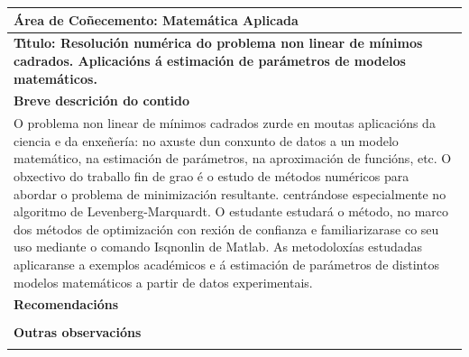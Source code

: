 \documentclass[11pt,a4paper]{book}
\theoremstyle{definition}
\theoremstyle{remark}
\begin{document}
\begingroup
\renewcommand*{\arraystretch}{2.2}
\begin{tabular}{|l|}
	\hline
	
	{\bf \'Area de Co\~necemento:  \/ Matemática Aplicada}\\ \hline
	\begin{minipage}{11.5cm}
		{\vspace*{.2cm}
			\bf T\'{\i}tulo:   \/ \bf Resolución numérica do problema non linear de mínimos cadrados. Aplicacións á estimación de parámetros de modelos matemáticos.
			\vspace{.2cm}}
	\end{minipage}\\ \hline
	\bf Breve descrici\'on do contido\\ \hline
	\begin{minipage}{11.5cm}
		{\vspace*{.2cm}
O problema non linear de mínimos cadrados zurde en moutas aplicacións da ciencia e da enxeñería: no axuste dun conxunto de datos a un modelo matemático, na estimación de parámetros, na aproximación de funcións, etc. O obxectivo do traballo fin de grao é o estudo de métodos numéricos para abordar o problema de minimización resultante. centrándose especialmente no algoritmo de Levenberg-Marquardt. O estudante estudará o método, no marco dos métodos de optimización con rexión de confianza e familiarizarase co seu uso mediante o comando Isqnonlin de Matlab. As metodoloxías estudadas aplicaranse a exemplos académicos e á estimación de parámetros de distintos modelos matemáticos a partir de datos experimentais.
		
		\vspace{.2cm}}
	\end{minipage}\\ \hline
	{\bf Recomendaci\'ons}\\ \hline
	\begin{minipage}{11.5cm}
		{\vspace*{.2cm}


		\vspace{.2cm}}
	\end{minipage}\\ \hline
	{\bf Outras observaci\'ons}\\ \hline
	\begin{minipage}{11.5cm}
		{\vspace*{.2cm}


			\vspace{.2cm}}
	\end{minipage}\\ \hline
\end{tabular}
\endgroup
\end{document}
